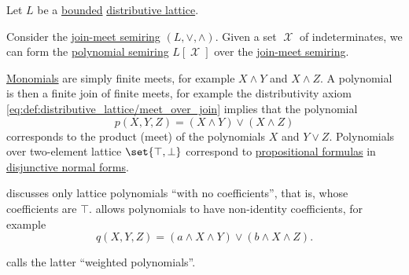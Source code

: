\begin{remark}\label{rem:lattice_polynomials}
  Let \( L \) be a \hyperref[def:extremal_points/bounds]{bounded} \hyperref[def:distributive_lattice]{distributive lattice}.

  Consider the \hyperref[ex:def:semiring/lattice]{join-meet semiring} \( (L, \vee, \wedge) \). Given a set \( \mscrX \) of indeterminates, we can form the \hyperref[def:polynomial_algebra]{polynomial semiring} \( L[\mscrX] \) over the \hyperref[ex:def:semiring/lattice]{join-meet semiring}.

  \hyperref[def:polynomial_algebra/monomials]{Monomials} are simply finite meets, for example \( X \wedge Y \) and \( X \wedge Z \). A polynomial is then a finite join of finite meets, for example the distributivity axiom \eqref{eq:def:distributive_lattice/meet_over_join} implies that the polynomial
  \begin{equation*}
    p(X, Y, Z) = (X \wedge Y) \vee (X \wedge Z)
  \end{equation*}
  corresponds to the product (meet) of the polynomials \( X \) and \( Y \vee Z \). Polynomials over two-element lattice \( \set{ \top, \bot } \) correspond to \hyperref[def:propositional_syntax/formula]{propositional formulas} in \hyperref[def:cnf_and_dnf]{disjunctive normal forms}.

   discusses only lattice polynomials \enquote{with no coefficients}, that is, whose coefficients are \( \top \).  allows polynomials to have non-identity coefficients, for example
  \begin{equation*}
    q(X, Y, Z) = (a \wedge X \wedge Y) \vee (b \wedge X \wedge Z).
  \end{equation*}

   calls the latter \enquote{weighted polynomials}.
\end{remark}

